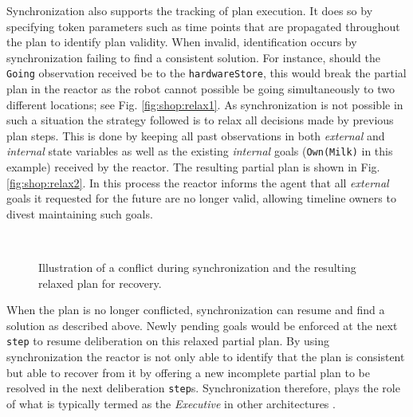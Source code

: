 Synchronization also supports the tracking of plan execution. It does
so by specifying token parameters such as time points that are
propagated throughout the plan to identify plan validity.
When invalid, identification occurs by synchronization failing to find
a consistent solution. For instance, should the \texttt{Going}
observation received be to the \texttt{hardwareStore}, this would
break the partial plan in the reactor as the robot cannot possible be
going simultaneously to two different locations; see Fig.
\ref{fig:shop:relax1}. As synchronization is not possible in such a
situation the strategy followed is to relax all decisions made by
previous plan steps. This is done by keeping all past observations in
both {\em external} and {\em internal} state variables as well as the
existing {\em internal} goals (\texttt{Own(Milk)} in this example)
received by the reactor. The resulting partial plan is shown in Fig.
\ref{fig:shop:relax2}. In this process the reactor informs the agent
that all {\em external} goals it requested for the future are no
longer valid, allowing timeline owners to divest maintaining such
goals.

\begin{figure}[!b]
  \centering
  \\
  \caption{\small Illustration of a conflict during synchronization
    and the resulting relaxed plan for recovery.}
\end{figure}

When the plan is no longer conflicted, synchronization can resume and
find a solution as described above. Newly pending goals would be
enforced at the next \texttt{step} to resume deliberation on this
relaxed partial plan. By using synchronization the reactor is not only
able to identify that the plan is consistent but able to recover from
it by offering a new incomplete partial plan to be resolved in the
next deliberation \texttt{step}s.  Synchronization therefore, plays
the role of what is typically termed as the {\em Executive} in other
architectures \cite{gat98, alami:1998p820, mus98, williams03,
  Nesnas:2003do}.

